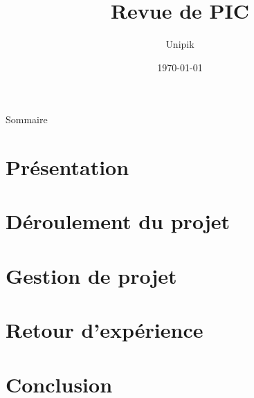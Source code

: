 \documentclass[compress,xcolor=dvipsnames]{beamer}
\title{Revue de PIC}
\date{\today}
\author{Unipik}
\institute{\insa}
\begin{document}
\speaker{\Pierre} 

\begin{frame}[plain]
	\titlepage
\end{frame}

\begin{frame}{Sommaire}
	\tableofcontents%
\end{frame}
 
\section[Présentation]{Présentation}


\section[Déroulement du projet]{Déroulement du projet}








\section[Gestion de projet]{Gestion de projet}


\section[Retour d'expérience]{Retour d'expérience}


\section[Conclusion]{Conclusion}

\end{document}

